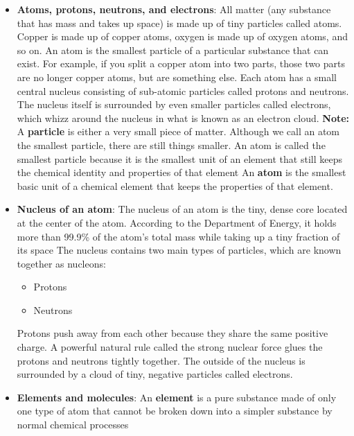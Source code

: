 \documentclass{report}
\begin{document}
    \begin{itemize}
        \item \textbf{Atoms, protons, neutrons, and electrons}: All matter (any substance that has mass and takes up space) is made up of tiny particles called atoms. Copper is made up of copper atoms, oxygen is made up of oxygen atoms, and so on. An atom is the smallest particle of a particular substance that can exist. For example, if you split a copper atom into two parts, those two parts are no longer copper atoms, but are something else. 
            \bigbreak \noindent 
            Each atom has a small central nucleus consisting of sub-atomic particles called protons and neutrons. The nucleus itself is surrounded by even smaller particles called electrons, which whizz around the nucleus in what is known as an electron cloud.
            \bigbreak \noindent 
            \bigbreak \noindent 
            \textbf{Note:} A \textbf{particle} is either a very small piece of matter.
            \bigbreak \noindent 
            Although we call an atom the smallest particle, there are still things smaller. An atom is called the smallest particle because it is the smallest unit of an element that still keeps the chemical identity and properties of that element
            \bigbreak \noindent 
            An \textbf{atom} is the smallest basic unit of a chemical element that keeps the properties of that element.
        \item \textbf{Nucleus of an atom}: The nucleus of an atom is the tiny, dense core located at the center of the atom. According to the Department of Energy, it holds more than 99.9\% of the atom's total mass while taking up a tiny fraction of its space
            \bigbreak \noindent 
            The nucleus contains two main types of particles, which are known together as nucleons:
            \begin{itemize}
                \item Protons
                \item Neutrons
            \end{itemize}
            Protons push away from each other because they share the same positive charge. A powerful natural rule called the strong nuclear force glues the protons and neutrons tightly together.
            \bigbreak \noindent 
            The outside of the nucleus is surrounded by a cloud of tiny, negative particles called electrons.
        \item \textbf{Elements and molecules}: An \textbf{element} is a pure substance made of only one type of atom that cannot be broken down into a simpler substance by normal chemical processes

\end{itemize}
\end{document}

